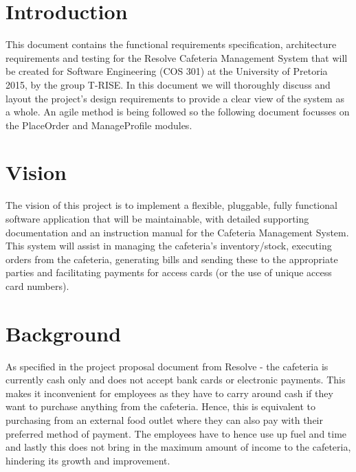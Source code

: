 \documentclass[12pt]{article}
\begin{document}
\maketitle
\break

\tableofcontents
\break


\section{Introduction}
This document contains the functional requirements specification, architecture requirements and testing for the Resolve Cafeteria Management System that will be created for Software Engineering (COS 301) at the University of Pretoria 2015, by the group T-RISE. In this document we will thoroughly discuss and layout the project's design requirements to provide a clear view of the system as a whole. An agile method is being followed so the following document focusses on the PlaceOrder and ManageProfile modules.

\section{Vision}
The vision of this project is to implement a flexible, pluggable, fully functional software application that will be maintainable, with detailed supporting documentation and an instruction manual for the Cafeteria Management System. This system will assist in managing the cafeteria's inventory/stock, executing orders from the cafeteria, generating bills and sending these to the appropriate parties and facilitating payments for access cards (or the use of unique access card numbers). 

\section{Background}
As specified in the project proposal document from Resolve - the cafeteria is currently cash only and does not accept bank cards or electronic payments. This makes it inconvenient for employees as they have to carry around cash if they want to purchase anything from the cafeteria. Hence, this is equivalent to purchasing from an external food outlet where they can also pay with their preferred method of payment. The employees have to hence use up fuel and time and lastly this does not bring in the maximum amount of income to the cafeteria, hindering its growth and improvement.\\
\end{document}

